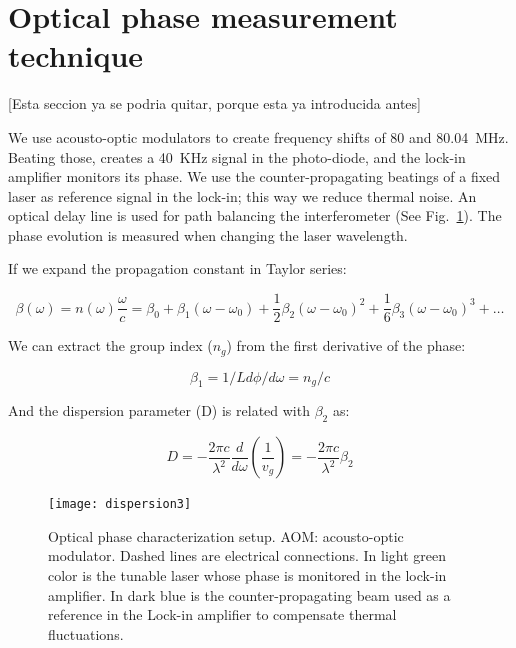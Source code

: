 \documentclass[journal]{IEEEtran}
\begin{document}



\section{Optical phase measurement technique}
[Esta seccion ya se podria quitar, porque esta ya introducida antes]

We use acousto-optic modulators to create frequency shifts of 80 and 80.04~MHz. Beating those, creates a 40~KHz signal in the photo-diode, and the lock-in amplifier monitors its phase. We use the counter-propagating beatings of a fixed laser as reference signal in the lock-in; this way we reduce thermal noise. An optical delay line is used for path balancing the interferometer (See Fig.~\ref{fig:dispersionSetup}). The phase evolution is measured when changing the laser wavelength.


If we expand the propagation constant in Taylor series:

\begin{equation}
	\beta(\omega)=n(\omega)\frac{\omega}{c}=\beta_0+\beta_1(\omega-\omega_0)+\frac{1}{2}\beta_2(\omega-\omega_0)^2 + \frac{1}{6}\beta_3(\omega-\omega_0)^3 + \ldots
\end{equation}


We can extract the group index ($n_g$) from the first derivative of the phase:

\begin{equation}
	\beta_1=1/Ld\phi/d\omega=n_g/c
\end{equation}

And the dispersion parameter (D) is related with $\beta_2$ as:

\begin{equation}
	D=-\frac{2\pi c}{\lambda^2}\frac{d}{d\omega}(\frac{1}{v_g})=-\frac{2\pi c}{\lambda^2}\beta_2
\end{equation}


\begin{figure}[htb]
	\centering
	\texttt{[image: dispersion3]}
	\caption{Optical phase characterization setup. AOM: acousto-optic modulator. Dashed lines are electrical connections. In light green color is the tunable laser whose phase is monitored in the lock-in amplifier. In dark blue is the counter-propagating beam used as a reference in the Lock-in amplifier to compensate thermal fluctuations.}
	\label{fig:dispersionSetup}
\end{figure}
\end{document}

